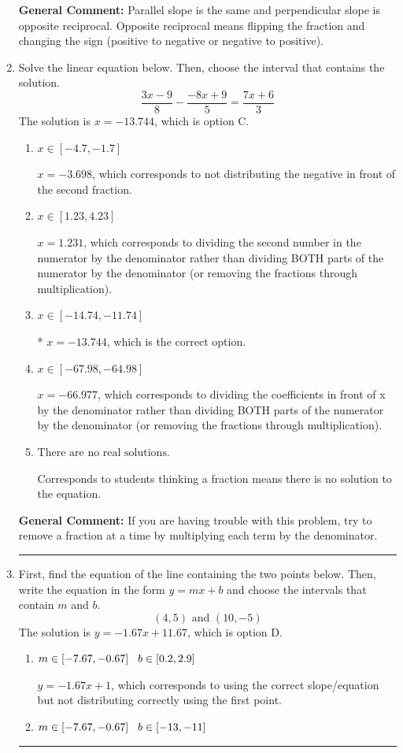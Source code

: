\documentclass{extbook}[14pt]
\newcommand{\litem}[1]{\item #1

\rule{\textwidth}{0.4pt}}
\begin{document}
\begin{enumerate}
{\textbf{General Comment:} Parallel slope is the same and perpendicular slope is opposite reciprocal. Opposite reciprocal means flipping the fraction and changing the sign (positive to negative or negative to positive).
}
\litem{
Solve the linear equation below. Then, choose the interval that contains the solution.
\[ \frac{3x -9}{8} - \frac{-8x + 9}{5} = \frac{7x + 6}{3} \]The solution is \( x = -13.744 \), which is option C.\begin{enumerate}[label=\Alph*.]
\item \( x \in [-4.7, -1.7] \)

 $x = -3.698$, which corresponds to not distributing the negative in front of the second fraction.
\item \( x \in [1.23, 4.23] \)

 $x = 1.231$, which corresponds to dividing the second number in the numerator by the denominator rather than dividing BOTH parts of the numerator by the denominator (or removing the fractions through multiplication).
\item \( x \in [-14.74, -11.74] \)

* $x = -13.744$, which is the correct option.
\item \( x \in [-67.98, -64.98] \)

 $x = -66.977$, which corresponds to dividing the coefficients in front of x by the denominator rather than dividing BOTH parts of the numerator by the denominator (or removing the fractions through multiplication).
\item \( \text{There are no real solutions.} \)

Corresponds to students thinking a fraction means there is no solution to the equation.
\end{enumerate}

\textbf{General Comment:} If you are having trouble with this problem, try to remove a fraction at a time by multiplying each term by the denominator.
}
\litem{
First, find the equation of the line containing the two points below. Then, write the equation in the form $ y=mx+b $ and choose the intervals that contain $m$ and $b$.
\[ (4, 5) \text{ and } (10, -5) \]The solution is \( y = -1.67x + 11.67 \), which is option D.\begin{enumerate}[label=\Alph*.]
\item \( m \in [-7.67, -0.67] \hspace*{3mm} b \in [0.2, 2.9] \)

 $y = -1.67x + 1$, which corresponds to using the correct slope/equation but not distributing correctly using the first point.
\item \( m \in [-7.67, -0.67] \hspace*{3mm} b \in [-13, -11] \)


\end{enumerate}}
\end{enumerate}
\end{document}
